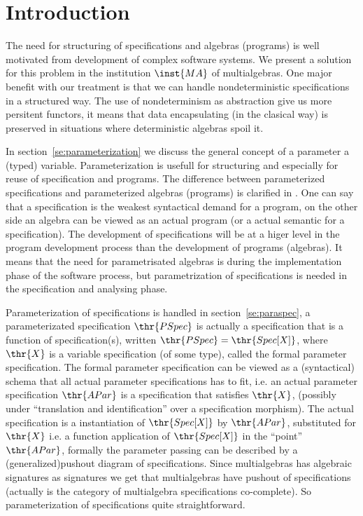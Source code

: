 
\section{Introduction}
The need for structuring of specifications and algebras (programs) is well motivated from  development of complex software systems. We present a solution for this problem in the institution $\inst{MA}$ of multialgebras. One major benefit with our treatment is that we can handle nondeterministic specifications in a structured way. The use of nondeterminism as abstraction give us more persitent functors, it means that data encapsulating (in the clasical way) is preserved in situations where deterministic algebras spoil it.

In section~\ref{se:parameterization} we discuss the general concept of a parameter a (typed) variable. Parameterization is usefull for structuring and especially for reuse of specification and programs. The difference between parameterized specifications and parameterized algebras (programs) is clarified in \cite{para}. One can say that a specification is the weakest syntactical demand for a program, on the other side an algebra can be viewed as an actual program (or a actual semantic for a specification). The development of specifications will be at a higer level in the program development process than the development of programs (algebras). It means that the need for parametrisated algebras is during the implementation phase of the software process, but parametrization of specifications is needed in the specification and analysing phase.

Parameterization of specifications is handled in section~\ref{se:paraspec}, a parameterizated specification $\thr{PSpec}$ is actually a specification that is a function of specification(s), written $\thr{PSpec} = \thr{Spec[X]}$, where $\thr{X}$ is a variable specification (of some type), called the formal parameter specification. The formal parameter specification can be viewed as a (syntactical) schema that all actual parameter specifications has to fit, i.e. an actual parameter specification $\thr{APar}$ is a specification that satisfies $\thr{X}$, (possibly under ``translation and identification'' over a specification morphism). The actual specification is a instantiation of $\thr{Spec[X]}$ by $\thr{APar}$, substituted for $\thr{X}$ i.e. a function application of $\thr{Spec[X]}$ in the ``point'' $\thr{APar}$, formally the parameter passing can be described by a (generalized)pushout diagram of specifications. Since multialgebras has algebraic signatures as signatures we get that multialgebras have pushout of specifications \cite{inst} (actually is the category of multialgebra specifications co-complete). So parameterization of specifications quite straightforward.

